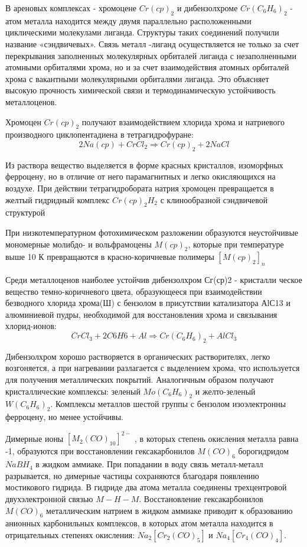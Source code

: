 \documentclass[11pt]{article}
\begin{document}
В ареновых комплексах - хромоцене $Cr(cp)_2$ и дибензолхроме $Cr(C_6H_6)_2$ - атом металла находится между двумя параллельно расположенными циклическими молекулами лиганда. Структуры таких соединений получили название «сэндвичевых». Связь металл -лиганд осуществляется не только за счет перекрывания заполненных молекулярных орбиталей лиганда с незаполненными атомными орбиталями хрома, но и за счет взаимодействия атомных орбиталей хрома с вакантными молекулярными орбиталями лиганда. Это объясняет высокую прочность химической связи и термодинамическую устойчивость металлоценов. 

Хромоцен $Cr(cp)_2$ получают взаимодействием хлорида хрома и натриевого производного циклопентадиена в тетрагидрофуране: 
$$2Na(cp) + CrCl_2 \Rightarrow Cr(cp)_2 + 2NaCl $$

Из раствора вещество выделяется в форме красных кристаллов, изоморфных ферроцену, но в отличие от него парамагнитных и легко окисляющихся на воздухе. При действии тетрагидробората натрия хромоцен превращается в желтый гидридный комплекс $Cr(cp)_2H_2$ с клинообразной сэндвичевой структурой 

При низкотемпературном фотохимическом разложении образуются неустойчивые мономерные молибдо- и вольфрамоцены $M(cp)_2$, которые при температуре выше 10 К превращаются в красно-коричневые полимеры 
$[M(cp)_2]_n$

Среди металлоценов наиболее устойчив дибензолхром Сг(ср)2 - кристалли­ ческое вещество темно-коричневого цвета, образующееся при взаимодействии безводного хлорида хрома(Ш) с бензолом в присутствии катализатора АlС13 и алюминиевой пудры, необходимой для восстановления хрома и связывания хлорид-ионов: 
$$CrCl_3 + 2C6H6 + Al \Rightarrow Cr(C_6H_6)_2 + AlCl_3 $$

Дибензолхром хорошо растворяется в органических растворителях, легко возгоняется, а при нагревании разлагается с выделением хрома, что используется для получения металлических покрытий. Аналогичным образом получают кристаллические комплексы: зеленый $Mo(C_6H_6)_2$ и желто-зеленый $W(C_6H_6)_2$. Комплексы металлов шестой группы с бензолом изоэлектронны ферроцену, но менее устойчивы. 

Димерные ионы $[M_2(CO)_{10}]^{2-}$ , в которых степень окисления металла равна -1, образуются при восстановлении гексакарбонилов $M(CO)_6$ борогидридом $NaBH_4$ в жидком аммиаке. При попадании в воду связь металл-металл разрывается, но димерные частицы сохраняются благодаря появлению мостикового гидрида. В гидриде два атома металла соединены трехцентровой двухэлектронной связью $M-H-M$. Восстановление гексакарбонилов $M(CO)_6$ металлическим натрием в жидком аммиаке приводит к образованию анионных карбонильных комплексов, в которых атом металла находится в отрицательных степенях окисления: $Na_2[Cr_2(CO)_5]$ и $Na_4[Cr_4(CO)_4]$. 
\end{document}
